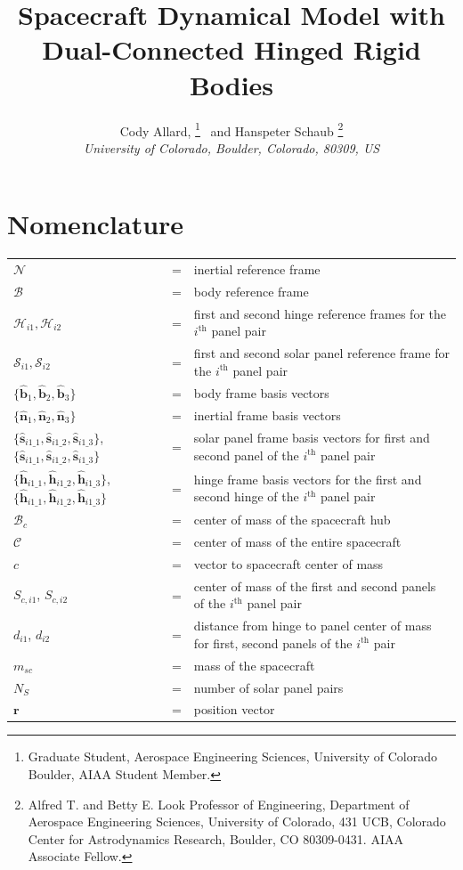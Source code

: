 \documentclass[paper]{aiaaNew}
\title{Spacecraft Dynamical Model with Dual-Connected Hinged Rigid Bodies}
\author{
	Cody Allard,%
	\thanks{Graduate Student, Aerospace Engineering Sciences, University of Colorado Boulder, AIAA Student Member.}
	\ and  Hanspeter Schaub%
	\thanks{Alfred T. and Betty E. Look Professor of Engineering, Department of Aerospace Engineering Sciences, University of Colorado, 431 UCB, Colorado Center for Astrodynamics Research, Boulder, CO 80309-0431. AIAA Associate Fellow.}\\
	{\normalsize\itshape
		University of Colorado, Boulder, Colorado, 80309, US}\\
}
\begin{document}
	
	
	\maketitle

	\section*{Nomenclature}
	\noindent\begin{tabular}{@{}lcl@{}}
		$\mathcal{N}$ &=& inertial reference frame \\
		$\mathcal{B}$ &=& body reference frame \\
		$\mathcal{H}_{i1}, \mathcal{H}_{i2}$ &=& first and second hinge reference frames for the $i^\text{th}$ panel pair \\
		$\mathcal{S}_{i1}, \mathcal{S}_{i2}$ &=& first and second solar panel reference frame for the $i^\text{th}$ panel pair \\
		$\{\hat{\bm b}_1,\hat{\bm b}_2,\hat{\bm b}_3\}$  &=&  body frame basis vectors\\
		$\{\hat{\bm n}_1,\hat{\bm n}_2,\hat{\bm n}_3\}$  &=&  inertial frame basis vectors\\
		$\{\hat{\bm s}_{i1\_1},\hat{\bm s}_{i1\_2},\hat{\bm s}_{i1\_3}\}$, $\{\hat{\bm s}_{i1\_1},\hat{\bm s}_{i1\_2},\hat{\bm s}_{i1\_3}\}$  &=&  solar panel frame basis vectors for first and second panel of the $i^\text{th}$ panel pair \\
		$\{\hat{\bm h}_{i1\_1},\hat{\bm h}_{i1\_2},\hat{\bm h}_{i1\_3}\}$, $\{\hat{\bm h}_{i1\_1},\hat{\bm h}_{i1\_2},\hat{\bm h}_{i1\_3}\}$ &=& hinge frame basis vectors for the first and second hinge of the $i^\text{th}$ panel pair \\
		$\mathcal{B}_{c}$ &=& center of mass of the spacecraft hub \\
		$\mathcal{C}$ &=& center of mass of the entire spacecraft \\
		$c$ &=& vector to spacecraft center of mass  \\
		$S_{c,i1}$,  $S_{c,i2}$ &=& center of mass of the first and second panels of the $i^\text{th}$ panel pair \\
		$d_{i1}$, $d_{i2}$ &=& distance from hinge to panel center of mass for first, second panels of the $i^\text{th}$ pair \\
		$m_{sc}$ &=& mass of the spacecraft \\
		$N_{S}$ &=& number of solar panel pairs \\
		$\bm r$ &=& position vector \\

\end{tabular}
\end{document}
